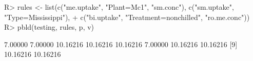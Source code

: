 \begin{Schunk}
% --begin: "pbld_custom"
\begin{Sinput}
R> rules <- list(c("me.uptake", "Plant=Mc1", "sm.conc"), c("sm.uptake", "Type=Mississippi"), 
+      c("bi.uptake", "Treatment=nonchilled", "ro.me.conc"))
R> pbld(testing, rules, p, v)
\end{Sinput}
\begin{Soutput}
 [1]  7.00000  7.00000 10.16216 10.16216 10.16216  7.00000 10.16216 10.16216
 [9] 10.16216 10.16216
\end{Soutput}
%
% --end: "pbld_custom"
\end{Schunk}
